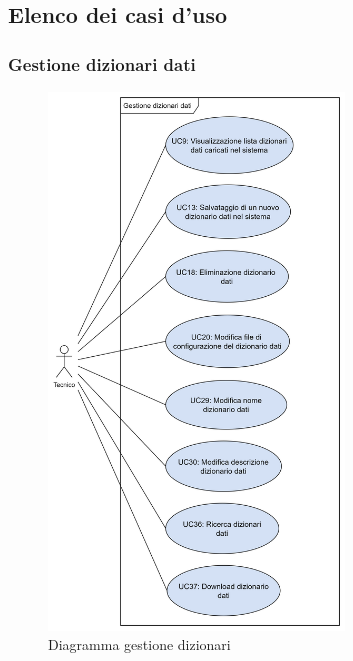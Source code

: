 \subsection{Elenco dei casi d'uso}













\subsubsection*{Gestione dizionari dati}
\begin{figure}[H]
  \centering
  \includegraphics[width=0.70\textwidth, height=0.90\textheight]{assets/gestione_dizionari.png}
  \caption{Diagramma gestione dizionari}
\end{figure}









